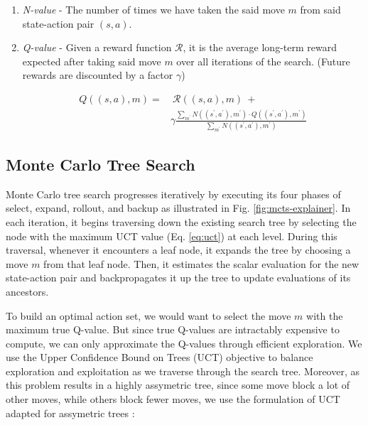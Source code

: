 \documentclass[%
 reprint,
amsmath,amssymb,
pra,
]{revtex4-2}
\begin{document}
\begin{enumerate}[label=(\roman*), noitemsep, nolistsep]
\item \textit{N-value} - The number of times we have taken the said move $m$ from said state-action pair $(s,a)$.
\item \textit{Q-value} - Given a reward function $\mathcal{R}$, it is the average long-term reward expected after taking said move $m$ over all iterations of the search. (Future rewards are discounted by a factor $\gamma$)

\begin{equation}
\begin{split}
    Q((s,a), m) =&\ \mathcal{R}((s,a), m)\ + \\ & \gamma \frac{\sum_{m^\prime} N((s^\prime, a^\prime), m^\prime) \cdot Q((s^\prime, a^\prime), m^\prime)}{\sum_{m^\prime} N((s^\prime, a^\prime), m^\prime)}
\end{split}
\end{equation}

\end{enumerate}

\subsection{\label{sec:method-mcts} Monte Carlo Tree Search}

Monte Carlo tree search progresses iteratively by executing its four phases of select, expand, rollout, and backup as illustrated in Fig. \ref{fig:mcts-explainer}. In each iteration, it begins traversing down the existing search tree by selecting the node with the maximum UCT value (Eq. \ref{eq:uct}) at each level. During this traversal, whenever it encounters a leaf node, it expands the tree by choosing a move $m$ from that leaf node. Then, it estimates the scalar evaluation for the new state-action pair and backpropagates it up the tree to update evaluations of its ancestors.

To build an optimal action set, we would want to select the move $m$ with the maximum true Q-value. But since true Q-values are intractably expensive to compute, we can only approximate the Q-values through efficient exploration. We use the Upper Confidence Bound on Trees (UCT) objective \citep{mcts_uct} to balance exploration and exploitation as we traverse through the search tree. Moreover, as this problem results in a highly assymetric tree, since some move block a lot of other moves, while others block fewer moves, we use the formulation of UCT adapted for assymetric trees \citep{mcts_assymetric}:
\end{document}
